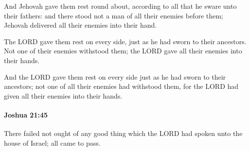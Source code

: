 			\begin{versebox}
					\item[BHS] 
					\item[ASV] And Jehovah gave them rest round about, according to all that he sware unto their fathers: and there stood not a man of all their enemies before them; Jehovah delivered all their enemies into their hand.
					\item[NIV] The LORD gave them rest on every side, just as he had sworn to their ancestors. Not one of their enemies withstood them; the LORD gave all their enemies into their hands.
					\item[NRSV] And the LORD gave them rest on every side just as he had sworn to their ancestors; not one of all their enemies had withstood them, for the LORD had given all their enemies into their hands.
			\end{versebox}

		\paragraph{Joshua 21:45} %
			\label{JOSHUA-21-45}

			There failed not ought of any good thing which the LORD had spoken unto the house of Israel; all came to pass.

